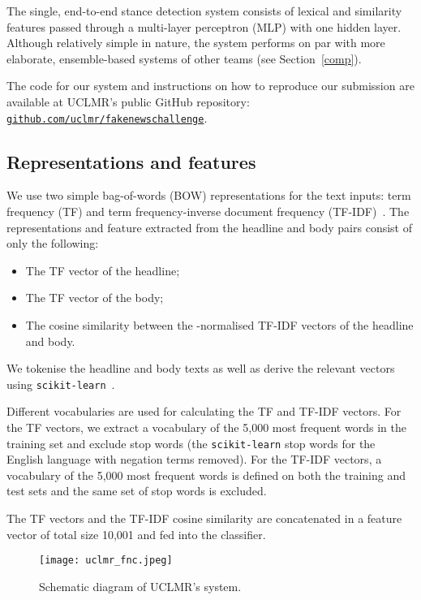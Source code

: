 \documentclass{article}
\begin{document}
The single, end-to-end stance detection system consists of lexical and similarity features passed through a multi-layer perceptron (MLP) with one hidden layer.
Although relatively simple in nature, the system performs on par with more elaborate, ensemble-based systems of other teams \cite{talos, athene} (see Section~\ref{comp}).

The code for our system and instructions on how to reproduce our submission are available at UCLMR's public GitHub repository: \hyperlink{http://www.github.com/uclmr/fakenewschallenge}{\texttt{github.com/uclmr/fakenewschallenge}}.

\subsection{Representations and features}

We use two simple bag-of-words (BOW) representations for the text inputs: term frequency (TF) and term frequency-inverse document frequency (TF-IDF)~\cite{tf, tfidf}.
The representations and feature extracted from the headline and body pairs consist of only the following:

\begin{itemize}
  \item The TF vector of the headline;
  \item The TF vector of the body;
  \item The cosine similarity between the -normalised TF-IDF vectors of the headline and body.
\end{itemize}

We tokenise the headline and body texts as well as derive the relevant vectors using \texttt{scikit-learn}~\cite{scikit}.

Different vocabularies are used for calculating the TF and TF-IDF vectors. For the TF vectors, we extract a vocabulary of the 5,000 most frequent words in the training set and exclude stop words (the \texttt{scikit-learn} stop words for the English language with negation terms removed). For the TF-IDF vectors, a vocabulary of the 5,000 most frequent words is defined on both the training and test sets and the same set of stop words is excluded.

The TF vectors and the TF-IDF cosine similarity are concatenated in a feature vector of total size 10,001 and fed into the classifier.

\bigskip
\begin{figure}[h]
  \centering
  \texttt{[image: uclmr\_fnc.jpeg]}
  \caption{Schematic diagram of UCLMR's system.}
  \label{fig: model}
\end{figure}
\bigskip
\end{document}
